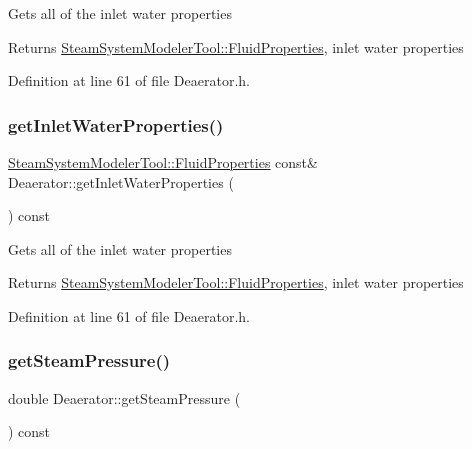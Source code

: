 Gets all of the inlet water properties \begin{DoxyReturn}{Returns}
\hyperlink{struct_steam_system_modeler_tool_1_1_fluid_properties}{Steam\+System\+Modeler\+Tool\+::\+Fluid\+Properties}, inlet water properties 
\end{DoxyReturn}


Definition at line 61 of file Deaerator.\+h.

\mbox{\label{class_deaerator_a9138c93cf6643e91ad7ce0de7fb328b7}} 
\subsubsection{\texorpdfstring{get\+Inlet\+Water\+Properties()}{getInletWaterProperties()}\hspace{0.1cm}{\footnotesize\ttfamily [3/3]}}
{\footnotesize\ttfamily \hyperlink{struct_steam_system_modeler_tool_1_1_fluid_properties}{Steam\+System\+Modeler\+Tool\+::\+Fluid\+Properties} const\& Deaerator\+::get\+Inlet\+Water\+Properties (\begin{DoxyParamCaption}{ }\end{DoxyParamCaption}) const\hspace{0.3cm}{\ttfamily [inline]}}

Gets all of the inlet water properties \begin{DoxyReturn}{Returns}
\hyperlink{struct_steam_system_modeler_tool_1_1_fluid_properties}{Steam\+System\+Modeler\+Tool\+::\+Fluid\+Properties}, inlet water properties 
\end{DoxyReturn}


Definition at line 61 of file Deaerator.\+h.

\mbox{\label{class_deaerator_aebe779c63cace193d040f497e3b70728}} 
\subsubsection{\texorpdfstring{get\+Steam\+Pressure()}{getSteamPressure()}\hspace{0.1cm}{\footnotesize\ttfamily [1/3]}}
{\footnotesize\ttfamily double Deaerator\+::get\+Steam\+Pressure (\begin{DoxyParamCaption}{ }\end{DoxyParamCaption}) const}

